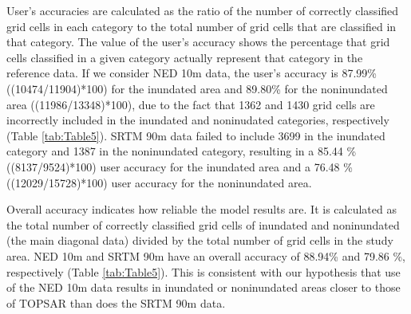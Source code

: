 \documentclass[12pt,letterpaper]{article}
\begin{document}
User's accuracies are calculated as the ratio of the number of
correctly classified grid cells in each category to the total number of
grid cells that are classified in that category. The value of the user's
accuracy shows the percentage that grid cells classified in a given
category actually represent that category in the reference data. If we
consider NED 10m data, the user's accuracy is 87.99\%
((10474/11904)*100) for the inundated area and 89.80\% for the
noninundated area ((11986/13348)*100), due to the fact that 1362 and
1430 grid cells are incorrectly included in the inundated and noninudated
categories, respectively (Table \ref{tab:Table5}). SRTM 90m data failed
to include 3699 in the inundated category and 1387 in the noninundated
category, resulting in a 85.44 \% ((8137/9524)*100) user accuracy for
the inundated area and a 76.48 \% ((12029/15728)*100) user accuracy
for the noninundated area.

Overall accuracy indicates how reliable the model results are. It is
calculated as the total number of correctly classified grid cells of
inundated and noninundated (the main diagonal data) divided by the
total number of grid cells in the study area. NED 10m and SRTM 90m have an
overall accuracy of 88.94\% and 79.86 \%, respectively (Table \ref{tab:Table5}).  This is consistent with our hypothesis that use of
the NED 10m data results in inundated or noninundated areas closer to
those of TOPSAR than does the SRTM 90m data.
\end{document}
